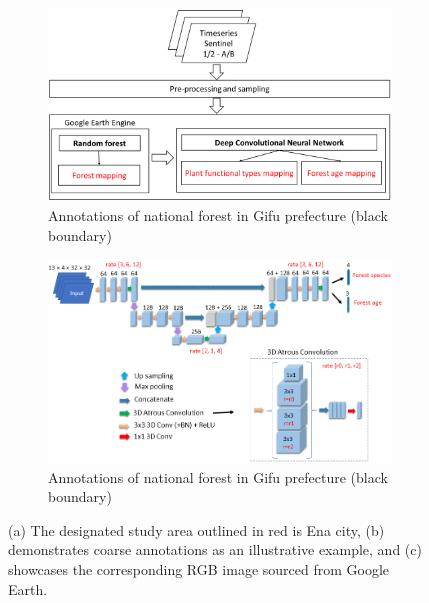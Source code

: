 \begin{figure}[p]
    \centering
    \begin{subfigure}{\textwidth}
        \centering
        \includegraphics[width=\textwidth]{figs/chap5/workflow.png}
        \caption{Annotations of national forest in Gifu prefecture (black boundary)}
        \label{fig:chap5_studyarea}
    \end{subfigure}

    \begin{subfigure}{\textwidth}
        \centering
        \includegraphics[width=\textwidth]{figs/chap5/model.png}
        \caption{Annotations of national forest in Gifu prefecture (black boundary)}
        \label{fig:chap5_studyarea}
    \end{subfigure}
    \caption[Study area and annotated data]{(a) The designated study area outlined in red is Ena city, (b) demonstrates coarse annotations as an illustrative example, and (c) showcases the corresponding RGB image sourced from Google Earth.}
    \label{fig:chap5_studyarea_gt}
\end{figure}

